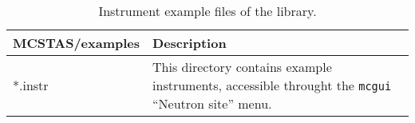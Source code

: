 \begin{table}
  \begin{center}
    {\let\my=\\
    \begin{tabular}{|p{}|p{}|}
      \hline
       {\bf MCSTAS/examples} & Description \\
      \hline
      *.instr & This directory contains example instruments, accessible throught the \verb+mcgui+ ``Neutron site'' menu. \\
      \hline
    \end{tabular}
    \caption{Instrument example files of the \MCS library.}
    \label{t:comp-instr}
    }
  \end{center}
\end{table}

